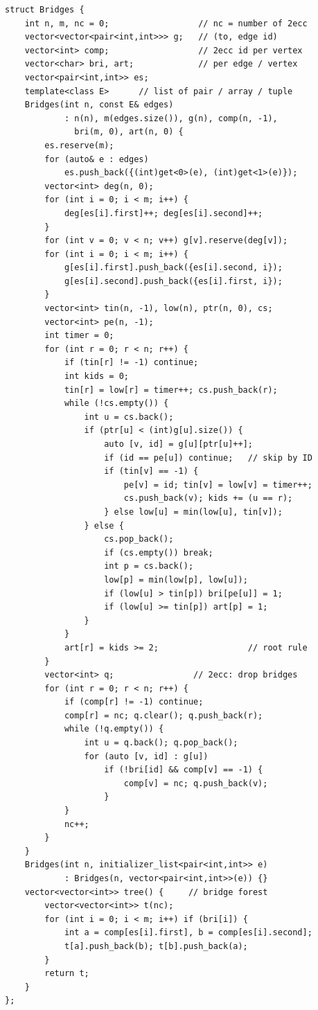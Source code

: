 \begin{lstlisting}
struct Bridges {
    int n, m, nc = 0;                  // nc = number of 2ecc
    vector<vector<pair<int,int>>> g;   // (to, edge id)
    vector<int> comp;                  // 2ecc id per vertex
    vector<char> bri, art;             // per edge / vertex
    vector<pair<int,int>> es;
    template<class E>      // list of pair / array / tuple
    Bridges(int n, const E& edges)
            : n(n), m(edges.size()), g(n), comp(n, -1),
              bri(m, 0), art(n, 0) {
        es.reserve(m);
        for (auto& e : edges)
            es.push_back({(int)get<0>(e), (int)get<1>(e)});
        vector<int> deg(n, 0);
        for (int i = 0; i < m; i++) {
            deg[es[i].first]++; deg[es[i].second]++;
        }
        for (int v = 0; v < n; v++) g[v].reserve(deg[v]);
        for (int i = 0; i < m; i++) {
            g[es[i].first].push_back({es[i].second, i});
            g[es[i].second].push_back({es[i].first, i});
        }
        vector<int> tin(n, -1), low(n), ptr(n, 0), cs;
        vector<int> pe(n, -1);
        int timer = 0;
        for (int r = 0; r < n; r++) {
            if (tin[r] != -1) continue;
            int kids = 0;
            tin[r] = low[r] = timer++; cs.push_back(r);
            while (!cs.empty()) {
                int u = cs.back();
                if (ptr[u] < (int)g[u].size()) {
                    auto [v, id] = g[u][ptr[u]++];
                    if (id == pe[u]) continue;   // skip by ID
                    if (tin[v] == -1) {
                        pe[v] = id; tin[v] = low[v] = timer++;
                        cs.push_back(v); kids += (u == r);
                    } else low[u] = min(low[u], tin[v]);
                } else {
                    cs.pop_back();
                    if (cs.empty()) break;
                    int p = cs.back();
                    low[p] = min(low[p], low[u]);
                    if (low[u] > tin[p]) bri[pe[u]] = 1;
                    if (low[u] >= tin[p]) art[p] = 1;
                }
            }
            art[r] = kids >= 2;                  // root rule
        }
        vector<int> q;                // 2ecc: drop bridges
        for (int r = 0; r < n; r++) {
            if (comp[r] != -1) continue;
            comp[r] = nc; q.clear(); q.push_back(r);
            while (!q.empty()) {
                int u = q.back(); q.pop_back();
                for (auto [v, id] : g[u])
                    if (!bri[id] && comp[v] == -1) {
                        comp[v] = nc; q.push_back(v);
                    }
            }
            nc++;
        }
    }
    Bridges(int n, initializer_list<pair<int,int>> e)
            : Bridges(n, vector<pair<int,int>>(e)) {}
    vector<vector<int>> tree() {     // bridge forest
        vector<vector<int>> t(nc);
        for (int i = 0; i < m; i++) if (bri[i]) {
            int a = comp[es[i].first], b = comp[es[i].second];
            t[a].push_back(b); t[b].push_back(a);
        }
        return t;
    }
};
\end{lstlisting}

